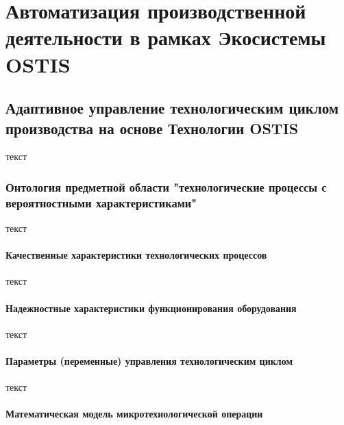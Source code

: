 \chapter{Автоматизация производственной деятельности в рамках Экосистемы OSTIS}
\label{chapter_enterprise}


\section{Адаптивное управление технологическим циклом производства на основе Технологии OSTIS}

текст

\subsection{Онтология предметной области "технологические процессы с вероятностными характеристиками"}

текст

\subsubsection{Качественные характеристики технологических процессов}

текст

\subsubsection{Надежностные характеристики функционирования оборудования}

текст

\subsubsection{Параметры (переменные) управления технологическим циклом}

текст

\subsubsection{Математическая модель микротехнологической операции}

